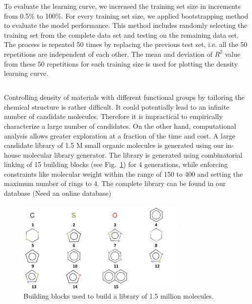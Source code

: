 To evaluate the learning curve, we increased the training set size in increments from 0.5\% to 100\%. For every training set size, we applied bootstrapping method to evaluate the model performance. This method includes randomly selecting the training set from the complete data set and testing on the remaining data set. The process is repeated 50 times by replacing the previous test set, i.e. all the 50 repetitions are independent of each other. The mean and deviation of $R^2$ value from these 50 repetitions for each training size is used for plotting the density learning curve. 

\subsection{\chemhtps}
\label{chemhtps}

Controlling density of materials with different functional groups by tailoring the chemical structure is rather difficult. It could potentially lead to an infinite number of candidate molecules. Therefore it is impractical to empirically characterize a large number of candidates. On the other hand, computational analysis allows greater exploration at a fraction of the time and cost. A large candidate library of 1.5 M small organic molecules is generated using our in-house molecular library generator. The library is generated using combinatorial linking of 15 building blocks (see Fig.\ \ref{fig:BB}) for 4 generations, while enforcing constraints like molecular weight within the range of 150 to 400 and setting the maximum number of rings to 4. The complete library can be found in our database (Need an online database)

\begin{figure}[htbp] 
	\centering
	\includegraphics[width=0.744\textwidth]{Chapter-6/Figures/BB_list.eps}
	\caption{Building blocks used to build a library of 1.5 million molecules.}
	\label{fig:BB} 
\end{figure} 

